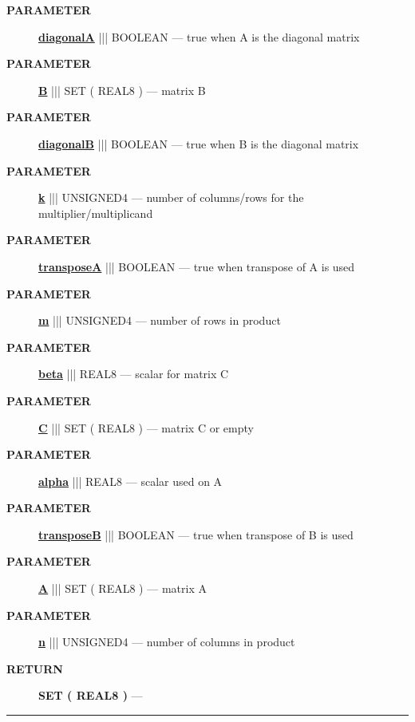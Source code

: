 \par
\begin{description}
\item [\colorbox{tagtype}{\color{white} \textbf{\textsf{PARAMETER}}}] \textbf{\underline{diagonalA}} ||| BOOLEAN --- true when A is the diagonal matrix
\item [\colorbox{tagtype}{\color{white} \textbf{\textsf{PARAMETER}}}] \textbf{\underline{B}} ||| SET ( REAL8 ) --- matrix B
\item [\colorbox{tagtype}{\color{white} \textbf{\textsf{PARAMETER}}}] \textbf{\underline{diagonalB}} ||| BOOLEAN --- true when B is the diagonal matrix
\item [\colorbox{tagtype}{\color{white} \textbf{\textsf{PARAMETER}}}] \textbf{\underline{k}} ||| UNSIGNED4 --- number of columns/rows for the multiplier/multiplicand
\item [\colorbox{tagtype}{\color{white} \textbf{\textsf{PARAMETER}}}] \textbf{\underline{transposeA}} ||| BOOLEAN --- true when transpose of A is used
\item [\colorbox{tagtype}{\color{white} \textbf{\textsf{PARAMETER}}}] \textbf{\underline{m}} ||| UNSIGNED4 --- number of rows in product
\item [\colorbox{tagtype}{\color{white} \textbf{\textsf{PARAMETER}}}] \textbf{\underline{beta}} ||| REAL8 --- scalar for matrix C
\item [\colorbox{tagtype}{\color{white} \textbf{\textsf{PARAMETER}}}] \textbf{\underline{C}} ||| SET ( REAL8 ) --- matrix C or empty
\item [\colorbox{tagtype}{\color{white} \textbf{\textsf{PARAMETER}}}] \textbf{\underline{alpha}} ||| REAL8 --- scalar used on A
\item [\colorbox{tagtype}{\color{white} \textbf{\textsf{PARAMETER}}}] \textbf{\underline{transposeB}} ||| BOOLEAN --- true when transpose of B is used
\item [\colorbox{tagtype}{\color{white} \textbf{\textsf{PARAMETER}}}] \textbf{\underline{A}} ||| SET ( REAL8 ) --- matrix A
\item [\colorbox{tagtype}{\color{white} \textbf{\textsf{PARAMETER}}}] \textbf{\underline{n}} ||| UNSIGNED4 --- number of columns in product
\end{description}







\par
\begin{description}
\item [\colorbox{tagtype}{\color{white} \textbf{\textsf{RETURN}}}] \textbf{SET ( REAL8 )} --- 
\end{description}




\rule{\linewidth}{0.5pt}
